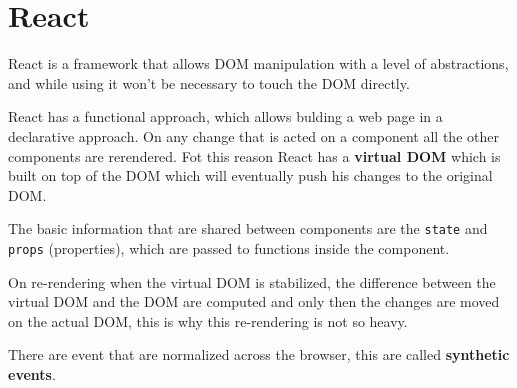 \documentclass[12pt]{article}
\begin{document}
\newpage
\section{React}
React is a framework that allows DOM manipulation with a level of abstractions, and while using it won't be necessary to touch the DOM directly.

React has a functional approach, which allows bulding a web page in a declarative approach. On any change that is acted on a component all the other components are rerendered. Fot this reason React has a \textbf{virtual DOM} which is built on top of the DOM which will eventually push his changes to the original DOM.

The basic information that are shared between components are the \texttt{state} and \texttt{props} (properties), which are passed to functions inside the component.

On re-rendering when the virtual DOM is stabilized, the difference between the virtual DOM and the DOM are computed and only then the changes are moved on the actual DOM, this is why this re-rendering is not so heavy.

There are event that are normalized across the browser, this are called \textbf{synthetic events}.
\end{document}
